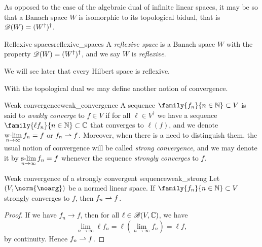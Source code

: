As opposed to the case of the algebraic dual of infinite linear spaces, it may be so that a Banach space \(W\) is isomorphic to its topological bidual, that is \(\mathscr{D}(W) = (W^\dag)^\dag\).
\begin{definition}{Reflexive spaces}{reflexive_spaces}
    A \emph{reflexive space} is a Banach space \(W\) with the property \(\mathscr{D}(W) = (W^\dag)^\dag\), and we say \(W\) is \emph{reflexive}.
\end{definition}
\begin{remark}
    We will see later that every Hilbert space is reflexive.
\end{remark}

With the topological dual we may define another notion of convergence.
\begin{definition}{Weak convergence}{weak_convergence}
    A sequence \(\family{f_n}{n\in \mathbb{N}} \subset V\) is said to \emph{weakly converge} to \(f \in V\) if for all \(\ell \in V^\dagger\) we have a sequence \(\family{\ell f_n}{n\in \mathbb{N}} \subset \mathbb{C}\) that converges to \(\ell(f)\), and we denote \(\displaystyle\operatorname*{w-lim}_{n\to\infty} f_n = f\) or \(f_n \rightharpoonup f\). Moreover, when there is a need to distinguish them, the usual notion of convergence will be called \emph{strong convergence}, and we may denote it by \(\displaystyle\operatorname*{s-lim}_{n\to\infty}f_n = f\) whenever the sequence \emph{strongly converges} to \(f\).
\end{definition}

\begin{proposition}{Weak convergence of a strongly convergent sequence}{weak_strong}
    Let \((V, \norm{\noarg})\) be a normed linear space. If \(\family{f_n}{n \in \mathbb{N}}\subset V\) strongly converges to \(f\), then \(f_n \rightharpoonup f\).
\end{proposition}
\begin{proof}
    If we have \(f_n \to f\), then for all \(\ell \in \mathscr{B}(V, \mathbb{C})\), we have
    \begin{equation*}
        \lim_{n\to \infty} \ell f_n = \ell\left(\lim_{n\to \infty} f_n\right) = \ell f,
    \end{equation*}
    by continuity. Hence \(f_n \rightharpoonup f\).
\end{proof}
